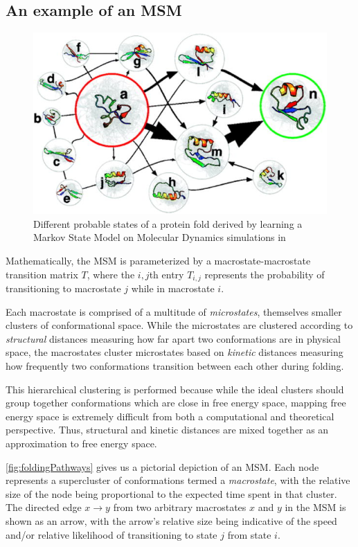 \documentclass{article}
\begin{document}
\subsection{An example of an MSM}

\begin{figure}[!h]
  \includegraphics[width=\linewidth]{images/folding_pathways.jpg}
  \caption{Different probable states of a protein fold derived by learning a Markov State Model on Molecular Dynamics simulations in \cite{pande2010}}
  \label{fig:foldingPathways}
\end{figure}

Mathematically, the MSM is parameterized by a macrostate-macrostate transition matrix $T$, where the $i,j$th entry $T_{i,j}$ represents the probability of transitioning to macrostate $j$ while in macrostate $i$. 

Each macrostate is comprised of a multitude of \textit{microstates}, themselves smaller clusters of conformational space. While the microstates are clustered according to \textit{structural} distances measuring how far apart two conformations are in physical space, the macrostates cluster microstates based on \textit{kinetic} distances measuring how frequently two conformations transition between each other during folding. 

This hierarchical clustering is performed because while the ideal clusters should group together conformations which are close in free energy space, mapping free energy space is extremely difficult from both a computational and theoretical perspective. Thus, structural and kinetic distances are mixed together as an approximation to free energy space. 

\autoref{fig:foldingPathways} gives us a pictorial depiction of an MSM. Each node represents a supercluster of conformations termed a \textit{macrostate}, with the relative size of the node being proportional to the expected time spent in that cluster. The directed edge $x \to y$ from two arbitrary macrostates $x$ and $y$ in the MSM is shown as an arrow, with the arrow's relative size being indicative of the speed and/or relative likelihood of transitioning to state $j$ from state $i$.
\end{document}
